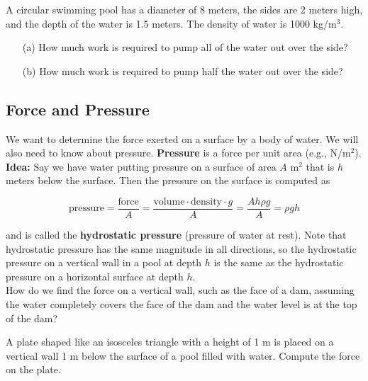 \documentclass[12pt]{article}
\begin{document}
\newpage 

\Example A circular swimming pool has a diameter of 8 meters, the sides are 2 meters high, and the depth of the water is 1.5 meters. The density of water is 1000 kg/m$^3$.

\begin{itemize}
\item[(a)] How much work is required to pump all of the water out over the side?

\vspace{120mm}

\item[(b)] How much work is required to pump half the water out over the side?

\end{itemize}

\newpage

\subsection*{Force and Pressure}

We want to determine the force exerted on a surface by a body of water. We will also need to know about pressure. \textbf{Pressure} is a force per unit area (e.g., N/m$^2$).\\

\textbf{Idea:} Say we have water putting pressure on a surface of area $A$ m$^2$ that is $h$ meters below the surface. Then the pressure on the surface is computed as

$$\text{pressure}=\frac{\text{force}}{A}=\frac{\text{volume}\cdot\text{density}\cdot g}{A}=\frac{Ah\rho g}{A}=\rho gh$$

and is called the \textbf{hydrostatic pressure} (pressure of water at rest). Note that hydrostatic pressure has the same magnitude in all directions, so the hydrostatic pressure on a vertical wall in a pool at depth $h$ is the same as the hydrostatic pressure on a horizontal surface at depth $h$.\\

How do we find the force on a vertical wall, such as the face of a dam, assuming the water completely covers the face of the dam and the water level is at the top of the dam?

\newpage

\Example A plate shaped like an isosceles triangle with a height of 1 m is placed on a vertical wall 1 m below the surface of a pool filled with water. Compute the force on the plate.
\end{document}
